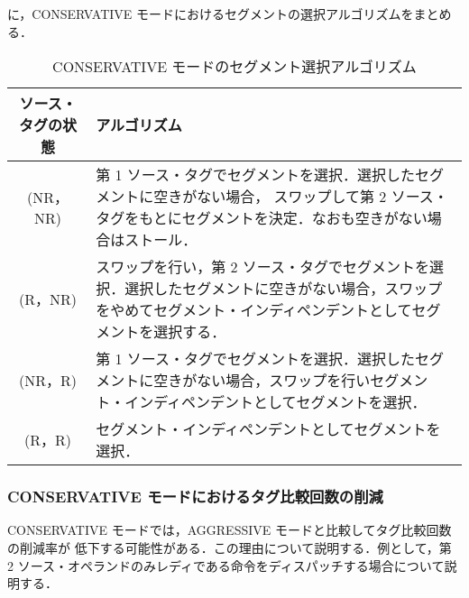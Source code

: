 に，CONSERVATIVE モードにおけるセグメントの選択アルゴリズムをまとめる．

\begin{table}[htb]
  \caption{CONSERVATIVE モードのセグメント選択アルゴリズム}
  \footnotesize
  \center
   \begin{tabular}{|c|p{13.5cm}|} \hline \hline
    ソース・タグの状態 & アルゴリズム \\ \hline
    (NR，NR) & 第 1 ソース・タグでセグメントを選択．選択したセグメントに空きがない場合， スワップして第 2 ソース・タグをもとにセグメントを決定．なおも空きがない場合はストール． \\ \hline
    (R，NR) & スワップを行い，第 2 ソース・タグでセグメントを選択．選択したセグメントに空きがない場合，スワップをやめてセグメント・インディペンデントとしてセグメントを選択する．\\ \hline
    (NR，R) & 第 1 ソース・タグでセグメントを選択．選択したセグメントに空きがない場合，スワップを行いセグメント・インディペンデントとしてセグメントを選択．\\ \hline
    (R，R) & セグメント・インディペンデントとしてセグメントを選択． \\ \hline
  \end{tabular}
  \label{tab:cons_algorithm}
\end{table}


\subsubsection{CONSERVATIVE モードにおけるタグ比較回数の削減}
CONSERVATIVE モードでは，AGGRESSIVE モードと比較してタグ比較回数の削減率が 低下する可能性がある．この理由について説明する．例として，第 2 ソース・オペランドのみレディである命令をディスパッチする場合について説明する．

